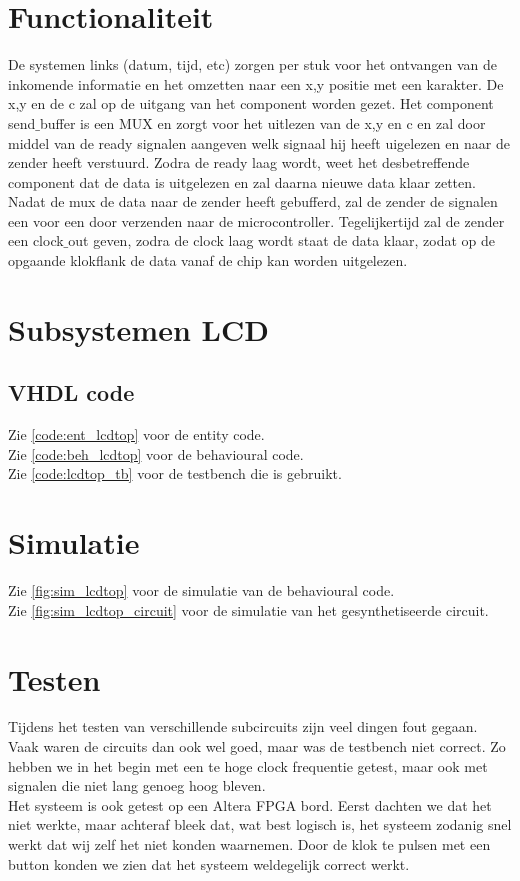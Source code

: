 \section{Functionaliteit}
De systemen links (datum, tijd, etc)  zorgen per stuk voor het ontvangen van de inkomende informatie en het omzetten naar een x,y positie met een karakter. De x,y en de c zal op de uitgang van het component worden gezet. 
Het component send$\_$buffer is een MUX en zorgt voor het uitlezen van de x,y en c en zal door middel van de ready signalen aangeven welk signaal hij heeft uigelezen en naar de zender heeft verstuurd. Zodra de ready laag wordt, weet het desbetreffende component dat de data is uitgelezen en zal daarna nieuwe data klaar zetten. 
Nadat de mux de data naar de zender heeft gebufferd, zal de zender de signalen een voor een door  verzenden naar de microcontroller. Tegelijkertijd zal de zender een clock$\_$out geven, zodra de clock laag wordt staat de data klaar, zodat op de opgaande klokflank de data vanaf de chip kan worden uitgelezen. 

\section{Subsystemen LCD}








\subsection{VHDL code}
Zie \ref{code:ent_lcdtop} voor de entity code. \\
Zie \ref{code:beh_lcdtop} voor de behavioural code.\\
Zie \ref{code:lcdtop_tb} voor de testbench die is gebruikt.

\section{Simulatie}
Zie \ref{fig:sim_lcdtop} voor de simulatie van de behavioural code. \\
Zie \ref{fig:sim_lcdtop_circuit} voor de simulatie van het gesynthetiseerde circuit. \\

\section{Testen}
Tijdens het testen van verschillende subcircuits zijn veel dingen fout gegaan. Vaak waren de circuits dan ook wel goed, maar was de testbench niet correct. Zo hebben we in het begin met een te hoge clock frequentie getest, maar ook met signalen die niet lang genoeg hoog bleven. \\
Het systeem is ook getest op een Altera FPGA bord. Eerst dachten we dat het niet werkte, maar achteraf bleek dat, wat best logisch is,  het systeem zodanig snel werkt dat wij zelf het niet konden waarnemen. Door de klok te pulsen met een button konden we zien dat het systeem weldegelijk correct werkt.


